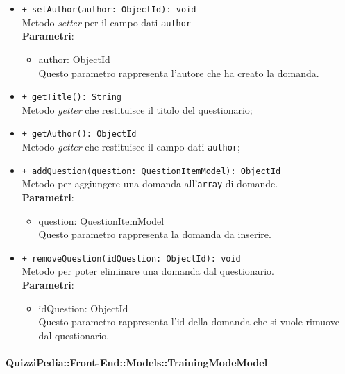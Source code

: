 \begin{itemize}
\begin{itemize}
				\item \texttt{+ setAuthor(author: ObjectId): void} \\
				Metodo \textit{setter} per il campo dati \texttt{author}\\
				\textbf{Parametri}:
				\begin{itemize}
					\item {author: ObjectId}\\
					Questo parametro rappresenta l'autore che ha creato la domanda.
				\end{itemize}
				
				\item \texttt{+ getTitle(): String} \\
				Metodo \textit{getter} che restituisce il titolo del questionario;
				
				\item \texttt{+ getAuthor(): ObjectId} \\
				Metodo \textit{getter} che restituisce il campo dati \texttt{author};
				
				\item \texttt{+ addQuestion(question: QuestionItemModel): ObjectId} \\
				Metodo per aggiungere una domanda all'\texttt{array} di domande.\\
				\textbf{Parametri}:
				\begin{itemize}
					\item {question: QuestionItemModel}\\
					Questo parametro rappresenta la domanda da inserire.
				\end{itemize}
				
				\item \texttt{+ removeQuestion(idQuestion: ObjectId): void} \\
				Metodo per poter eliminare una domanda dal questionario.\\
				\textbf{Parametri}:
				\begin{itemize}
					\item {idQuestion: ObjectId}\\
					Questo parametro rappresenta l'id della domanda che si vuole rimuove dal questionario.
				\end{itemize}
				
				
			\end{itemize}
		\end{itemize}	
		
		\paragraph{QuizziPedia::Front-End::Models::TrainingModeModel}
		
